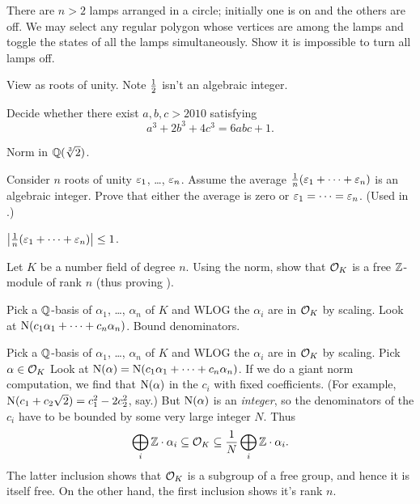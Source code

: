 \begin{problem}
	There are $n > 2$ lamps arranged in a circle; initially one is on and the others are off.
	We may select any regular polygon whose vertices are among the lamps
	and toggle the states of all the lamps simultaneously.
	Show it is impossible to turn all lamps off.
	\begin{hint}
		View as roots of unity. Note $\frac{1}{2}$ isn't an algebraic integer.
	\end{hint}
\end{problem}

\begin{problem}
	 Decide whether there exist $a,b,c > 2010$ satisfying
	\[ a^3+2b^3+4c^3=6abc+1. \]
	\begin{hint}
		Norm in $\mathbb Q(\sqrt[3]2)$.
	\end{hint}
\end{problem}


\begin{sproblem}
	\label{prob:rep_lemma}
	Consider $n$ roots of unity $\varepsilon_1$, \dots, $\varepsilon_n$.
	Assume the average $\frac1n(\varepsilon_1 + \dots + \varepsilon_n)$ is an algebraic integer.
	Prove that either the average is zero or $\varepsilon_1 = \dots = \varepsilon_n$.
	(Used in .)
	\begin{hint}
		$\left\lvert \frac 1n(\varepsilon_1 + \dots + \varepsilon_n) \right\rvert \le 1$.
	\end{hint}
\end{sproblem}

\begin{problem}
	\label{prob:OK_free_Z_module}
	\gim
	Let $K$ be a number field of degree $n$.
	Using the norm, show that $\mathcal O_K$ is a free $\mathbb Z$-module of rank $n$
	(thus proving ).
	\begin{hint}
		Pick a $\mathbb Q$-basis of $\alpha_1$, \dots, $\alpha_n$ of $K$ and WLOG
		the $\alpha_i$ are in $\mathcal O_K$ by scaling.
		Look at $\operatorname{N}(c_1\alpha_1 + \dots + c_n\alpha_n)$.
		Bound denominators.
	\end{hint}
	\begin{sol}
		Pick a $\mathbb Q$-basis of $\alpha_1$, \dots, $\alpha_n$ of $K$ and WLOG
		the $\alpha_i$ are in $\mathcal O_K$ by scaling.
		Pick $\alpha \in \mathcal O_K$
		Look at $\operatorname{N}(\alpha) = \operatorname{N}(c_1\alpha_1 + \dots + c_n\alpha_n)$.
		If we do a giant norm computation, we find that $\operatorname{N}(\alpha)$
		in the $c_i$ with fixed coefficients.
		(For example, $\operatorname{N}(c_1 + c_2\sqrt 2) = c_1^2 - 2c_2^2$, say.)
		But $\operatorname{N}(\alpha)$ is an \emph{integer}, so the denominators of the $c_i$ 
		have to be bounded by some very large integer $N$.
		Thus
		\[
			\bigoplus_i \mathbb Z \cdot \alpha_i
			\subseteq 
			\mathcal O_K
			\subseteq
			\frac 1N \bigoplus_i \mathbb Z \cdot \alpha_i.
		\]
		The latter inclusion shows that $\mathcal O_K$ is a subgroup
		of a free group, and hence it is itself free.
		On the other hand, the first inclusion shows it's rank $n$.
	\end{sol}
\end{problem}


